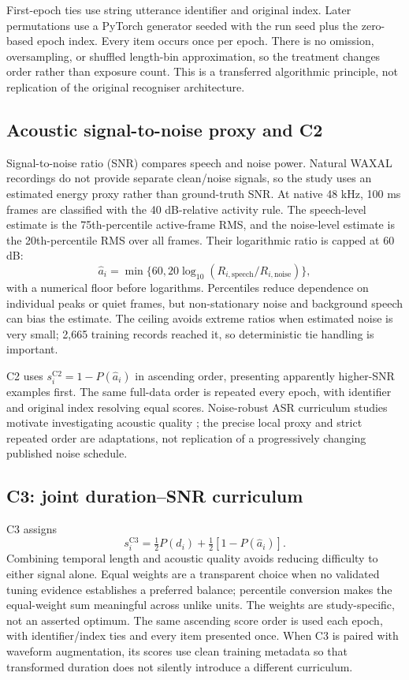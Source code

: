 \documentclass[12pt,a4paper]{report}
\begin{document}
First-epoch ties use string utterance identifier and original index. Later permutations use a PyTorch generator seeded with the run seed plus the zero-based epoch index. Every item occurs once per epoch. There is no omission, oversampling, or shuffled length-bin approximation, so the treatment changes order rather than exposure count. This is a transferred algorithmic principle, not replication of the original recogniser architecture.

\subsection{Acoustic signal-to-noise proxy and C2}

Signal-to-noise ratio (SNR) compares speech and noise power. Natural WAXAL recordings do not provide separate clean/noise signals, so the study uses an estimated energy proxy rather than ground-truth SNR. At native 48 kHz, 100 ms frames are classified with the 40 dB-relative activity rule. The speech-level estimate is the 75th-percentile active-frame RMS, and the noise-level estimate is the 20th-percentile RMS over all frames. Their logarithmic ratio is capped at 60 dB:
\begin{equation}
\widehat a_i=\min\{60,20\log_{10}(R_{i,\mathrm{speech}}/R_{i,\mathrm{noise}})\},
\end{equation}
with a numerical floor before logarithms. Percentiles reduce dependence on individual peaks or quiet frames, but non-stationary noise and background speech can bias the estimate. The ceiling avoids extreme ratios when estimated noise is very small; 2,665 training records reached it, so deterministic tie handling is important.

C2 uses $s_i^{\mathrm{C2}}=1-P(\widehat a_i)$ in ascending order, presenting apparently higher-SNR examples first. The same full-data order is repeated every epoch, with identifier and original index resolving equal scores. Noise-robust ASR curriculum studies motivate investigating acoustic quality \citep{Braun2017}; the precise local proxy and strict repeated order are adaptations, not replication of a progressively changing published noise schedule.

\subsection{C3: joint duration--SNR curriculum}

C3 assigns
\begin{equation}s_i^{\mathrm{C3}}=\tfrac12P(d_i)+\tfrac12[1-P(\widehat a_i)].\end{equation}
Combining temporal length and acoustic quality avoids reducing difficulty to either signal alone. Equal weights are a transparent choice when no validated tuning evidence establishes a preferred balance; percentile conversion makes the equal-weight sum meaningful across unlike units. The weights are study-specific, not an asserted optimum. The same ascending score order is used each epoch, with identifier/index ties and every item presented once. When C3 is paired with waveform augmentation, its scores use clean training metadata so that transformed duration does not silently introduce a different curriculum.
\end{document}
